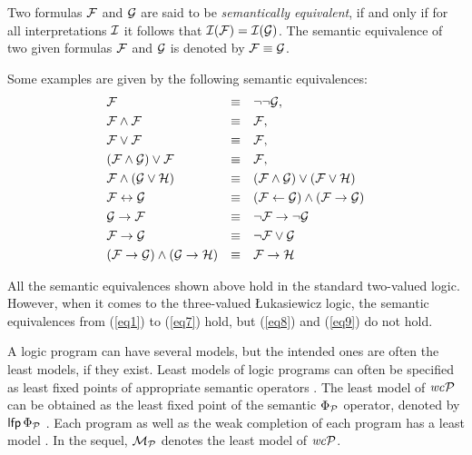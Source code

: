 \begin{definition}
\normalfont
Two formulas $\mathcal{F}$ and $\mathcal{G}$ are said to be \textit{semantically equivalent}, if and only if for all interpretations $\mathcal{I}$ it follows that $\mathcal{I}(\mathcal{F}) = \mathcal{I}(\mathcal{G})$. The semantic equivalence of two given formulas $\mathcal{F}$ and $\mathcal{G}$ is denoted by $\mathcal{F} \equiv \mathcal{G}$. 

Some examples are given by the following semantic equivalences:
\begin{align}
\label{eq1} &\mathcal{F} & \equiv  &\quad\neg\neg\mathcal{G}, \\
\label{eq2} &\mathcal{F} \wedge \mathcal{F} & \equiv &\quad\mathcal{F}, \\
\label{eq3} &\mathcal{F} \vee \mathcal{F} & \equiv  &\quad\mathcal{F}, \\
\label{eq4} &(\mathcal{F} \wedge \mathcal{G}) \vee \mathcal{F}  & \equiv &\quad\mathcal{F},\\
\label{eq5} &\mathcal{F} \wedge (\mathcal{G} \vee \mathcal{H})& \equiv &\quad (\mathcal{F} \wedge \mathcal{G}) \vee (\mathcal{F} \vee \mathcal{H})\\
\label{eq6} &\mathcal{F} \leftrightarrow \mathcal{G} & \equiv &\quad (\mathcal{F} \leftarrow \mathcal{G}) \wedge (\mathcal{F} \rightarrow \mathcal{G})\\
\label{eq7} &\mathcal{G} \rightarrow \mathcal{F} & \equiv  &\quad\neg\mathcal{F} \rightarrow \neg\mathcal{G}\\
\label{eq8} &\mathcal{F} \rightarrow \mathcal{G} & \equiv  &\quad\neg\mathcal{F} \vee \mathcal{G}\\
\label{eq9} &(\mathcal{F} \rightarrow \mathcal{G}) \wedge (\mathcal{G} \rightarrow \mathcal{H}) & \equiv  &\quad\mathcal{F} \rightarrow \mathcal{H}
\end{align}


All the semantic equivalences shown above hold in the standard two-valued logic. However, when it comes to the three-valued {\L}ukasiewicz logic, the semantic equivalences from (\ref{eq1}) to (\ref{eq7}) hold, but (\ref{eq8}) and (\ref{eq9}) do not hold.
\end{definition}

A logic program can have several models, but the intended ones are often the least models, if they exist. Least models of logic programs can often be specified as least fixed points of appropriate semantic operators \cite{apt1982contributions}. The least model of $\mathit{wc} \mathcal{P}$ can be obtained as the least fixed point of the semantic $\Phi_{\mathcal{P}}$ operator, denoted by $\mathsf{lfp}\, \Phi_{\mathcal{P}}$ \cite{stenning2012human}. Each program as well as the weak completion of each program has a least model \cite{holldobler2009logic}. In the sequel, $\mathcal{M}_{\mathcal{P}}$ denotes the least model of $\mathit{wc} \mathcal{P}$. 

